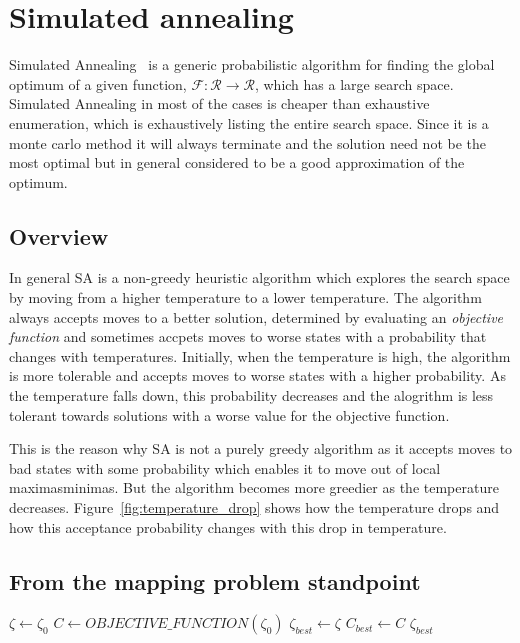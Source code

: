 \section{Simulated annealing}
\label{sec:simulated-annealing}

Simulated Annealing~\cite{kirkpatrick} is a generic probabilistic
algorithm for finding the global optimum of a given function,
$\mathcal{F}:\mathcal{R}\rightarrow\mathcal{R}$, which has a large
search space.  Simulated Annealing in most of the cases is cheaper than
exhaustive enumeration, which is exhaustively listing the entire search
space. Since it is a monte carlo method it will always terminate and the
solution need not be the most optimal but in general considered to be a
good approximation of the optimum.

\subsection{Overview}

In general SA is a non-greedy heuristic algorithm which explores the
search space by moving from a higher temperature to a lower
temperature. The algorithm always accepts moves to a better solution,
determined by evaluating an \emph{objective function} and sometimes
accpets moves to worse states with a probability that changes with
temperatures. Initially, when the temperature is high, the algorithm is
more tolerable and accepts moves to worse states with a higher
probability. As the temperature falls down, this probability decreases
and the alogrithm is less tolerant towards solutions with a worse value
for the objective function.

This is the reason why SA is not a purely greedy algorithm as it accepts
moves to bad states with some probability which enables it to move out
of local maximas\/minimas. But the algorithm becomes more greedier as
the temperature decreases. Figure~\ref{fig:temperature_drop} shows how
the temperature drops and how this acceptance probability changes with
this drop in temperature.

\subsection{From the mapping problem standpoint}

\begin{algorithm}
  \DontPrintSemicolon
    $\zeta \leftarrow \zeta_0$\;
    $C \leftarrow OBJECTIVE\_FUNCTION(\zeta_0)$\;
    $\zeta_{best} \leftarrow \zeta$\;
    $C_{best} \leftarrow C$\;
    \Return $\zeta_{best}$
  \caption{$Simulated\_Annealing(\zeta_0, T_0)$}
  \label{algo:SA}
\end{algorithm}

